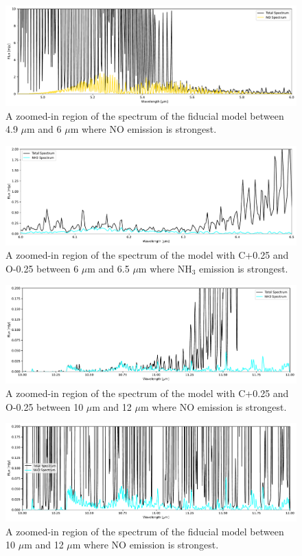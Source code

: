 \documentclass[twoside, single, authoryear, semicolon]{lion-msc}
\newcommand{\4}{$_4$}
\newcommand{\3}{$_3$}
\newcommand{\2}{$_2$}
\begin{document}
\begin{figure}[!ht]
    \centering
    \includegraphics[width=\linewidth]{Figures/NO_region.pdf}
    \caption{A zoomed-in region of the spectrum of the fiducial model between 4.9 $\mu$m and 6 $\mu$m where NO emission is strongest.}
    \label{fig: NO region}
\end{figure}

\begin{figure}[!ht]
    \centering
    \includegraphics[width=\linewidth]{Figures/NH3_region1.pdf}
    \caption{A zoomed-in region of the spectrum of the model with C+0.25 and O-0.25 between 6 $\mu$m and 6.5 $\mu$m where NH\3 emission is strongest.}
    \label{fig: NH3 region 1}
\end{figure}
\begin{figure}[!ht]
    \centering
    \includegraphics[width=\linewidth]{Figures/NH3_region2.pdf}
    \caption{A zoomed-in region of the spectrum of the model with C+0.25 and O-0.25 between 10 $\mu$m and 12 $\mu$m where NO emission is strongest.}
    \label{fig: NH3 region 2}
\end{figure}
\begin{figure}[!ht]
    \centering
    \includegraphics[width=\linewidth]{Figures/NH3_region3.pdf}
    \caption{A zoomed-in region of the spectrum of the fiducial model between 10 $\mu$m and 12 $\mu$m where NO emission is strongest.}
    \label{fig: NH3 region 3}
\end{figure}
\end{document}

